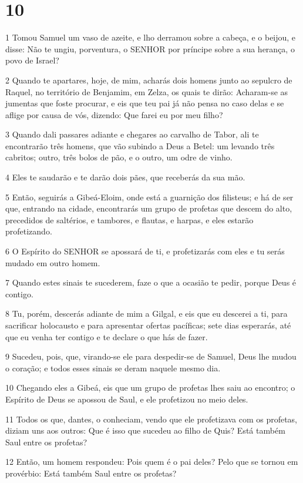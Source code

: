 \chapter{10}

\par 1 Tomou Samuel um vaso de azeite, e lho derramou sobre a cabeça, e o beijou, e disse: Não te ungiu, porventura, o SENHOR por príncipe sobre a sua herança, o povo de Israel?
\par 2 Quando te apartares, hoje, de mim, acharás dois homens junto ao sepulcro de Raquel, no território de Benjamim, em Zelza, os quais te dirão: Acharam-se as jumentas que foste procurar, e eis que teu pai já não pensa no caso delas e se aflige por causa de vós, dizendo: Que farei eu por meu filho?
\par 3 Quando dali passares adiante e chegares ao carvalho de Tabor, ali te encontrarão três homens, que vão subindo a Deus a Betel: um levando três cabritos; outro, três bolos de pão, e o outro, um odre de vinho.
\par 4 Eles te saudarão e te darão dois pães, que receberás da sua mão.
\par 5 Então, seguirás a Gibeá-Eloim, onde está a guarnição dos filisteus; e há de ser que, entrando na cidade, encontrarás um grupo de profetas que descem do alto, precedidos de saltérios, e tambores, e flautas, e harpas, e eles estarão profetizando.
\par 6 O Espírito do SENHOR se apossará de ti, e profetizarás com eles e tu serás mudado em outro homem.
\par 7 Quando estes sinais te sucederem, faze o que a ocasião te pedir, porque Deus é contigo.
\par 8 Tu, porém, descerás adiante de mim a Gilgal, e eis que eu descerei a ti, para sacrificar holocausto e para apresentar ofertas pacíficas; sete dias esperarás, até que eu venha ter contigo e te declare o que hás de fazer.
\par 9 Sucedeu, pois, que, virando-se ele para despedir-se de Samuel, Deus lhe mudou o coração; e todos esses sinais se deram naquele mesmo dia.
\par 10 Chegando eles a Gibeá, eis que um grupo de profetas lhes saiu ao encontro; o Espírito de Deus se apossou de Saul, e ele profetizou no meio deles.
\par 11 Todos os que, dantes, o conheciam, vendo que ele profetizava com os profetas, diziam uns aos outros: Que é isso que sucedeu ao filho de Quis? Está também Saul entre os profetas?
\par 12 Então, um homem respondeu: Pois quem é o pai deles? Pelo que se tornou em provérbio: Está também Saul entre os profetas?
